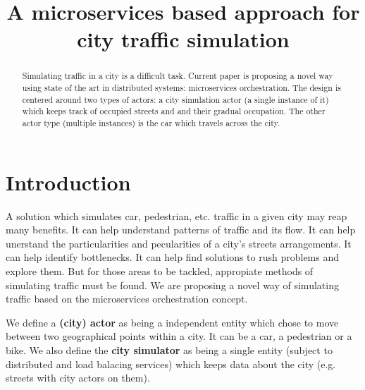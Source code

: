 \documentclass[conference]{IEEEtran}
\begin{document}
\title{A microservices based approach for city traffic simulation}

\author{
    \and
}

\maketitle

\begin{abstract}

Simulating traffic in a city is a difficult task. Current paper is proposing a novel way using state of the art in distributed systems: microservices orchestration. The design is centered around two types of actors: a city simulation actor (a single instance of it) which keeps track of occupied streets and and their gradual occupation. The other actor type (multiple instances) is the car which travels across the city.

\end{abstract}

\section{Introduction}

A solution which simulates car, pedestrian, etc. traffic in a given city may reap many benefits. It can help understand patterns of traffic and its flow. It can help unerstand the particularities and pecularities of a city's streets arrangements. It can help identify bottlenecks. It can help find solutions to rush problems and explore them. But for those areas to be tackled, appropiate methods of simulating traffic must be found. We are proposing a novel way of simulating traffic based on the microservices orchestration concept.

We define a \textbf{(city) actor} as being a independent entity which chose to move between two geographical points within a city. It can be a car, a pedestrian or a bike. We also define the \textbf{city simulator} as being a single entity (subject to distributed and load balacing services) which keeps data about the city (e.g. streets with city actors on them).
\end{document}
